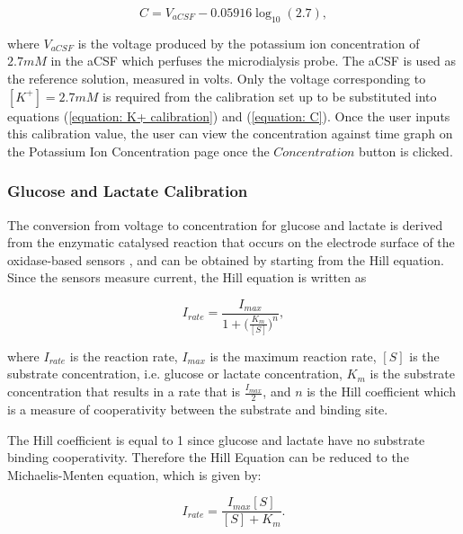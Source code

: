 \begin{equation}
    C = V_{aCSF} - 0.05916\log_{10} (2.7),
    \label{equation: C}
\end{equation}

\noindent where $V_{aCSF}$ is the voltage produced by the potassium ion concentration of $2.7mM$ in the aCSF which perfuses the microdialysis probe. The aCSF is used as the reference solution, measured in volts. Only the voltage corresponding to $[K^{+}] = 2.7mM$ is required from the calibration set up to be substituted into equations (\ref{equation: K+ calibration}) and (\ref{equation: C}). Once the user inputs this calibration value, the user can view the concentration against time graph on the Potassium Ion Concentration page once the $Concentration$ button is clicked. \newline




\subsubsection{Glucose and Lactate Calibration}

The conversion from voltage to concentration for glucose and lactate is derived from the enzymatic catalysed reaction that occurs on the electrode surface of the oxidase-based sensors \cite{Patel2011, Rogers2017}, and can be obtained by starting from the Hill equation. Since the sensors measure current, the Hill equation is written as

\begin{equation}
    I_{rate} = \frac{I_{max}}{1 + \big( \frac{K_{m}}{[S]} \big)^{n}},
    \label{equation: Hill equation}
\end{equation}

\noindent where $I_{rate}$ is the reaction rate, $I_{max}$ is the maximum reaction rate, $[S]$ is the substrate concentration, i.e. glucose or lactate concentration, $K_{m}$ is the substrate concentration that results in a rate that is $\frac{I_{max}}{2}$, and $n$ is the Hill coefficient which is a measure of cooperativity between the substrate and binding site.

The Hill coefficient is equal to 1 since glucose and lactate have no substrate binding cooperativity. Therefore the Hill Equation can be reduced to the Michaelis-Menten equation, which is given by:

\begin{equation}
    I_{rate} = \frac{I_{max}[S]}{[S] + K_{m}}.
    \label{equation: Michaelis_menten}
\end{equation}

